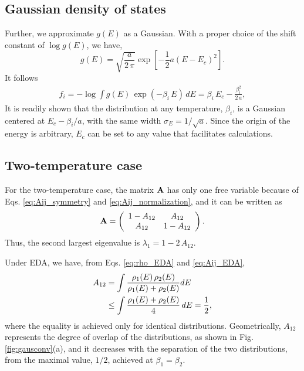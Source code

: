 \documentclass[reprint,aip,jcp,superscriptaddress]{revtex4-1}
\begin{document}
\subsection{Gaussian density of states}



Further, we approximate $g(E)$
as a Gaussian.
%
With a proper choice of the shift constant of
$\log g(E)$, we have,
%
\begin{equation}
g(E)
=
\sqrt{
  \frac{ a } { 2 \, \pi }
}
\exp\left[ -\frac 1 2 a (E - E_c)^2 \right].
\label{eq:gE_Gaussian}
\end{equation}
%
It follows
%
\begin{align}
f_i
=
-\log
\int
g(E) \, \exp(-\beta_i \, E) \, dE
=
\beta_i \, E_c - \frac{ \beta_i^2 }{ 2 \, a },
\label{eq:f_Gaussian}
\end{align}
%
%
It is readily shown that
the distribution at any temperature,
$\beta_i$,
is a Gaussian
centered at $E_c - \beta_i/a$,
with the same width
$\sigma_E = 1/\sqrt{a}$.
%
Since the origin of the energy is arbitrary,
$E_c$ can be set to any value
that facilitates calculations.



\subsection{Two-temperature case}



For the two-temperature case,
the matrix $\mathbf{A}$ has only one free variable
because of Eqs. \eqref{eq:Aij_symmetry}
and \eqref{eq:Aij_normalization},
and it can be written as
%
\begin{align*}
\mathbf{A}
=
\left(
\begin{array}{ccc}
  1 - A_{12} & A_{12} \\
  A_{12}     & 1 - A_{12}
\end{array}
\right).
\end{align*}
%
Thus,
the second largest eigenvalue is
$\lambda_1 = 1 - 2 \, A_{12}$.



Under EDA,
we have, from
Eqs. \eqref{eq:rho_EDA} and \eqref{eq:Aij_EDA},
%
\begin{align}
A_{12}
&=
\int
\frac{ \rho_1(E) \, \rho_2(E) }
{ \rho_1(E) + \rho_2(E) }
dE
\notag \\
&\le
\int
\frac{ \rho_1(E) + \rho_2(E) }
{ 4 }
\, dE
= \frac 1 2,
\notag
\end{align}
where
the equality is achieved
only for identical distributions.
%
Geometrically,
$A_{12}$
represents the degree of overlap
of the distributions,
as shown in Fig. \ref{fig:gausconv}(a),
%
and it decreases
with the separation
of the two distributions,
from the maximal value, $1/2$,
achieved at $\beta_1 = \beta_2$.
\end{document}
